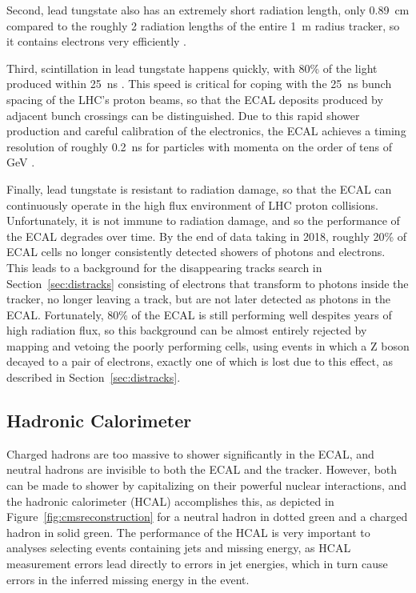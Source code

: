   Second, lead tungstate also has an extremely short radiation length, only 0.89~cm compared to the roughly 2 radiation lengths of the entire 1~m radius tracker, so it contains electrons very efficiently \cite{cms_tdr}.

  Third, scintillation in lead tungstate happens quickly, with 80\% of the light produced within 25~ns \cite{cms_tdr}. 
  This speed is critical for coping with the 25~ns bunch spacing of the LHC's proton beams, so that the ECAL deposits produced by adjacent bunch crossings can be distinguished.
  Due to this rapid shower production and careful calibration of the electronics, the ECAL achieves a timing resolution of roughly 0.2~ns for particles with momenta on the order of tens of GeV \cite{ecaltiming}.

  Finally, lead tungstate is resistant to radiation damage, so that the ECAL can continuously operate in the high flux environment of LHC proton collisions.
  Unfortunately, it is not immune to radiation damage, and so the performance of the ECAL degrades over time.
  By the end of data taking in 2018, roughly 20\% of ECAL cells no longer consistently detected showers of photons and electrons.
  This leads to a background for the disappearing tracks search in Section~\ref{sec:distracks} consisting of electrons that transform to photons inside the tracker, no longer leaving a track, but are not later detected as photons in the ECAL.
  Fortunately, 80\% of the ECAL is still performing well despites years of high radiation flux, so this background can be almost entirely rejected by mapping and vetoing the poorly performing cells, using events in which a Z boson decayed to a pair of electrons, exactly one of which is lost due to this effect, as described in Section~\ref{sec:distracks}.

  \subsection{Hadronic Calorimeter} \label{sec:hcal}

  Charged hadrons are too massive to shower significantly in the ECAL, and neutral hadrons are invisible to both the ECAL and the tracker.
  However, both can be made to shower by capitalizing on their powerful nuclear interactions, and the hadronic calorimeter (HCAL) accomplishes this, as depicted in Figure~\ref{fig:cmsreconstruction} for a neutral hadron in dotted green and a charged hadron in solid green.
  The performance of the HCAL is very important to analyses selecting events containing jets and missing energy, as HCAL measurement errors lead directly to errors in jet energies, which in turn cause errors in the inferred missing energy in the event.

